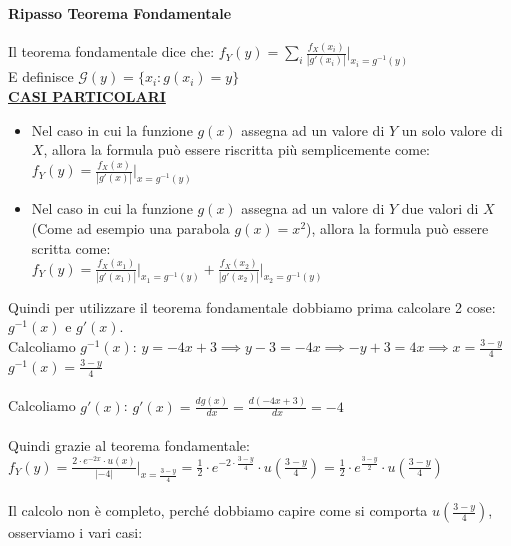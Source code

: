 \documentclass{article}
\begin{document}
\paragraph{Ripasso Teorema Fondamentale}
Il teorema fondamentale dice che: $f_Y(y) = \sum_i \frac{f_X(x_i)}{|g'(x_i)|} \Big|_{x_i = g^{-1}(y)}$ \\
E definisce $\mathcal{G}(y) = \big\{ x_i : g(x_i) = y \big\}$ \\
\textbf{\underline{CASI PARTICOLARI}}
\begin{itemize}
    \item Nel caso in cui la funzione $g(x)$ assegna ad un valore di $Y$ un solo valore di $X$, allora la formula può essere riscritta più semplicemente come: \\
    $f_Y(y) = \frac{f_X(x)}{|g'(x)|} \Big|_{x = g^{-1}(y)}$
    \item Nel caso in cui la funzione $g(x)$ assegna ad un valore di $Y$ due valori di $X$ (Come ad esempio una parabola $g(x) = x^2$), allora la formula può essere scritta come: \\
    $f_Y(y) = \frac{f_X(x_1)}{|g'(x_1)|} \Big|_{x_1 = g^{-1}(y)} + \frac{f_X(x_2)}{|g'(x_2)|} \Big|_{x_2 = g^{-1}(y)}$
\end{itemize} 
Quindi per utilizzare il teorema fondamentale dobbiamo prima calcolare 2 cose: $g^{-1}(x)$ e $g'(x)$. \\
Calcoliamo $g^{-1}(x)$: $y = -4x+3 \implies y-3=-4x \implies -y+3 = 4x \implies x = \frac{3-y}{4}$ \\
$g^{-1}(x) = \frac{3-y}{4}$ \\ \\
Calcoliamo $g'(x)$: $g'(x) = \frac{dg(x)}{dx} = \frac{d(-4x+3)}{dx} = -4$ \\ \\
Quindi grazie al teorema fondamentale: \\
$f_Y(y) = \frac{2 \cdot e^{-2x} \cdot u(x)}{|-4|} \Big|_{x=\frac{3-y}{4}} = \frac 12 \cdot e^{-2\cdot \frac{3-y}{4}} \cdot u \left( \frac{3-y}{4} \right) = \frac 12 \cdot e^{\frac{3-y}{2}} \cdot u \left( \frac{3-y}{4} \right)$ \\ \\
Il calcolo non è completo, perché dobbiamo capire come si comporta $u \left( \frac{3-y}{4} \right)$, osserviamo i vari casi:
\end{document}
